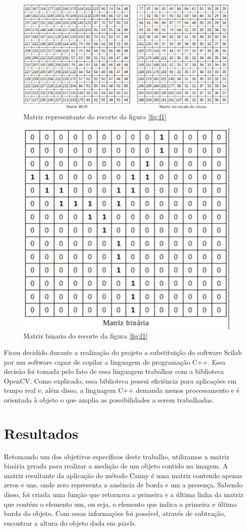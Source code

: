 \documentclass[12pt]{article}
\begin{document}
	 \begin{figure}[h!]
	 	\centering
	 	\includegraphics[width=0.9\linewidth]{img/F2}
	 	\caption{Matriz representante do recorte da figura \ref{fig:f1}}
	 	\label{fig:f2}
	 \end{figure}
	 
	\begin{figure}[h!]
		\centering
		\includegraphics[width=0.4\linewidth]{img/F3}
		\caption{Matriz binaria do recorte da figura \ref{fig:f1}}
		\label{fig:f3}
	\end{figure}
	
	Ficou decidido durante a realização do projeto a substituição do software Scilab por um software capaz de copilar a linguagem de programação C++. Essa decisão foi tomada pelo fato de essa linguagem trabalhar com a biblioteca OpenCV. Como explicado, essa biblioteca possui eficiência para aplicações em tempo real e, além disso, a linguagem C++ demanda menos processamento e é orientada à objeto o que amplia as possibilidades a serem trabalhadas.
	
	\section{Resultados}
	
	Retomando um dos objetivos específicos deste trabalho, utilizamos a matriz binária gerada para realizar a medição de um objeto contido na imagem. A matriz resultante da aplicação do método Canny é uma matriz contendo apenas zeros e uns, onde zero representa a ausência de borda e um a presença. Sabendo disso, foi criada uma função que retornava a primeira e a última linha da matriz que contém o elemento um, ou seja, o elemento que indica a primeira e última borda do objeto. Com essas informações foi possível, através de subtração, encontrar a altura do objeto dada em \textit{pixels}.
	
\end{document}
